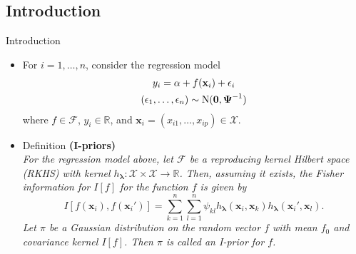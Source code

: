 \documentclass[]{beamer}\usepackage[]{graphicx}\usepackage[]{color}
\newcommand{\N}{\text{\normalfont N}}
\begin{document}

\subsection{Introduction}

\begin{frame}{Introduction}
	\vspace{-4mm}

	\begin{itemize}
		\item For $i = 1, \dots, n$, consider the regression model
		\begin{align*}
			\begin{gathered}
				y_i = \alpha + f(\mathbf x_i) + \epsilon_i \\
				(\epsilon_1, \dots, \epsilon_n) \sim \N(\mathbf 0, \boldsymbol{\Psi}^{-1})
			\end{gathered}
		\end{align*}
		where $f \in \mathcal F$, $y_i \in \mathbb R$, and $\mathbf x_i = (x_{i1}, \dots, x_{ip}) \in \mathcal X$.

	\pause
	\item Definition \textbf{(I-priors)} \\
	\textit{For the regression model above, let $\mathcal F$ be a reproducing kernel Hilbert space (RKHS) with kernel $h_{\boldsymbol\lambda}: \mathcal X \times \mathcal X \rightarrow \mathbb R$. Then, assuming it exists, the Fisher information for $I[f]$ for the function $f$ is given by
		\[
		I[f(\mathbf x_i), f(\mathbf x_i')] = \sum_{k=1}^n \sum_{l=1}^n \psi_{kl} h_{\boldsymbol\lambda}(\mathbf x_i, \mathbf x_k) h_{\boldsymbol\lambda}(\mathbf x_i', \mathbf x_l).
		\]
		Let $\pi$ be a Gaussian distribution on the random vector $f$ with mean $f_0$ and covariance kernel $I[f]$. Then $\pi$ is called an I-prior for $f$.
	}
	\end{itemize}
\end{frame}
\end{document}
